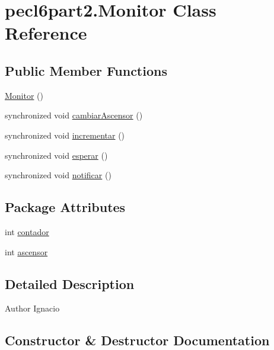 \hypertarget{classpecl6part2_1_1_monitor}{}\section{pecl6part2.\+Monitor Class Reference}
\label{classpecl6part2_1_1_monitor}
\subsection*{Public Member Functions}
\begin{DoxyCompactItemize}
\item 
\mbox{\hyperlink{classpecl6part2_1_1_monitor_a5536d0457447aae6c00be38f0414d386}{Monitor}} ()
\item 
synchronized void \mbox{\hyperlink{classpecl6part2_1_1_monitor_aba7c54d3f7bb8f4e19bcec5d7f8dcb76}{cambiar\+Ascensor}} ()
\item 
synchronized void \mbox{\hyperlink{classpecl6part2_1_1_monitor_accec6614f7f330bda0ce5a47ec7ac502}{incrementar}} ()
\item 
synchronized void \mbox{\hyperlink{classpecl6part2_1_1_monitor_aaf66683271f65268b7d18799972819e0}{esperar}} ()
\item 
synchronized void \mbox{\hyperlink{classpecl6part2_1_1_monitor_a77ff6dc9ee3ab70a9f20daea657d856b}{notificar}} ()
\end{DoxyCompactItemize}
\subsection*{Package Attributes}
\begin{DoxyCompactItemize}
\item 
int \mbox{\hyperlink{classpecl6part2_1_1_monitor_a0d9c747a36ef376665ed43b257c623ad}{contador}}
\item 
int \mbox{\hyperlink{classpecl6part2_1_1_monitor_abfc1bfd2de962ac64f1c505d9dbe136a}{ascensor}}
\end{DoxyCompactItemize}


\subsection{Detailed Description}
\begin{DoxyAuthor}{Author}
Ignacio 
\end{DoxyAuthor}


\subsection{Constructor \& Destructor Documentation}
\mbox{\label{classpecl6part2_1_1_monitor_a5536d0457447aae6c00be38f0414d386}} 
